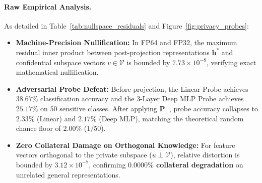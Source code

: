 \begin{table}[t]
\centering
\small
\caption{\textbf{Nullspace Projection Residuals Across Subspace Ranks and Precisions.}}
\label{tab:nullspace_residuals}
\end{table}

\paragraph{Raw Empirical Analysis.}
As detailed in Table~\ref{tab:nullspace_residuals} and Figure~\ref{fig:privacy_probes}:
\begin{itemize}[leftmargin=*]
    \item \textbf{Machine-Precision Nullification:} In FP64 and FP32, the maximum residual inner product between post-projection representations $\mathbf{h}^*$ and confidential subspace vectors $v \in \mathcal{V}$ is bounded by $7.73 \times 10^{-8}$, verifying exact mathematical nullification.
    \item \textbf{Adversarial Probe Defeat:} Before projection, the Linear Probe achieves $38.67\%$ classification accuracy and the 3-Layer Deep MLP Probe achieves $25.17\%$ on 50 sensitive classes. After applying $\mathbf{P}_\perp$, probe accuracy collapses to \textbf{$2.33\%$} (Linear) and \textbf{$2.17\%$} (Deep MLP), matching the theoretical random chance floor of $2.00\%$ ($1/50$).
    \item \textbf{Zero Collateral Damage on Orthogonal Knowledge:} For feature vectors orthogonal to the private subspace ($u \perp \mathcal{V}$), relative distortion is bounded by $3.12 \times 10^{-7}$, confirming \textbf{$0.0000\%$ collateral degradation} on unrelated general representations.
\end{itemize}

